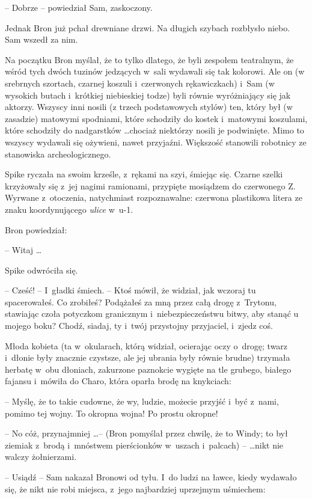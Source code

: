 \documentclass[oneside,polish,11pt,rmheadings]{mwbk}
\begin{document}
-- Dobrze -- powiedział Sam, zaskoczony. 

Jednak Bron już pchał drewniane drzwi. Na długich szybach rozbłysło niebo. Sam wszedł za nim. 

Na początku Bron myślał, że to tylko dlatego, że byli zespołem teatralnym, że wśród tych dwóch tuzinów jedzących w~sali wydawali się tak kolorowi. Ale on (w srebrnych szortach, czarnej koszuli i~czerwonych rękawiczkach) i~Sam (w wysokich butach i~krótkiej niebieskiej todze) byli równie wyróżniający się jak aktorzy. Wszyscy inni nosili (z trzech podstawowych stylów) ten, który był (w zasadzie) matowymi spodniami, które schodziły do kostek i~matowymi koszulami, które schodziły do nadgarstków \ldots  chociaż niektórzy nosili je podwinięte. Mimo to wszyscy wydawali się ożywieni, nawet przyjaźni. Większość stanowili robotnicy ze stanowiska archeologicznego. 

Spike ryczała na swoim krześle, z~rękami na szyi, śmiejąc się. Czarne szelki krzyżowały się z~jej nagimi ramionami, przypięte mosiądzem do czerwonego Z. Wyrwane z~otoczenia, natychmiast rozpoznawalne: czerwona plastikowa litera ze znaku koordynującego \textit{ulice} w~u-1. 

Bron powiedział:

-- Witaj \ldots  

Spike odwróciła się.

 -- Cześć! -- I~gładki śmiech. -- Ktoś mówił, że widział, jak wczoraj tu spacerowałeś. Co zrobiłeś? Podążałeś za mną przez całą drogę z~Trytonu, stawiając czoła potyczkom granicznym i~niebezpieczeństwu bitwy, aby stanąć u mojego boku? Chodź, siadaj, ty i~twój przystojny przyjaciel, i~zjedz coś. 

Młoda kobieta (ta w~okularach, którą widział, ocierając oczy o~drogę; twarz i~dłonie były znacznie czystsze, ale jej ubrania były równie brudne) trzymała herbatę w~obu dłoniach, zakurzone paznokcie wygięte na tle grubego, białego fajansu i~mówiła do Charo, która oparła brodę na knykciach:

-- Myślę, że to takie cudowne, że wy, ludzie, możecie przyjść i~być z~nami, pomimo tej wojny. To okropna wojna! Po prostu okropne! 

-- No cóż, przynajmniej \ldots  -- (Bron pomyślał przez chwilę, że to Windy; to był ziemiak z~brodą i~mnóstwem pierścionków w~uszach i~palcach) --  \ldots nikt nie walczy żołnierzami. 

-- Usiądź -- Sam nakazał Bronowi od tyłu. I~do ludzi na ławce, kiedy wydawało się, że nikt nie robi miejsca, z~jego najbardziej uprzejmym uśmiechem: 
\end{document}
